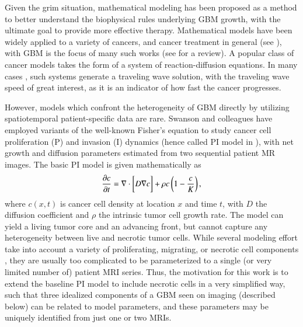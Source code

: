 \documentclass{aims}
\numberwithin{equation}{section}
\begin{document}
Given the grim situation, mathematical modeling has been proposed as a method to better understand the biophysical rules underlying GBM growth, with the ultimate goal to provide more effective therapy.  Mathematical models have been widely applied to a variety of cancers, and cancer treatment in general (see \cite{Kuang}), with GBM is the focus of many such works (see \cite{GBMreview} for a review).  A popular class of cancer models takes the form of a system of reaction-diffusion equations. In many cases \cite{Harley2014,Gerlee2016,Stepien2018}, such systems generate a traveling wave solution, with the traveling wave speed of great interest, as it is an indicator of how fast the cancer progresses.

However, models which confront the heterogeneity of GBM directly by utilizing spatiotemporal patient-specific data are rare. Swanson and colleagues \cite{Swanson2008,Neal2013,Jackson2015a} have employed variants of the well-known Fisher's equation to study cancer cell proliferation (P) and invasion (I) dynamics \cite{FISHER1937} (hence called PI model in \cite{Jackson2015a}), with net growth and diffusion parameters estimated from two sequential patient MR images.  The basic PI model is given mathematically as
\begin{equation}
\frac{\partial c}{\partial t} = \nabla\cdot\bigg[D \nabla{c}\bigg] + \rho c \left(1 - \frac{c}{K}\right),
\end{equation}
where $c(x,t)$ is cancer cell density at location $x$ and time $t$, with $D$ the diffusion coefficient and $\rho$ the intrinsic tumor cell growth rate.  The model can yield a living tumor core and an advancing front, but cannot capture any heterogeneity between live and necrotic tumor cells.  While several modeling effort take into account a variety of proliferating, migrating, or necrotic cell components \cite{Eikenberry2009,Swanson2011}, they are usually too complicated to be parameterized to a single (or very limited number of) patient MRI series.  Thus, the motivation for this work is to extend the baseline PI model to include necrotic cells in a very simplified way, such that three idealized components of a GBM seen on imaging (described below) can be related to model parameters, and these parameters may be uniquely identified from just one or two MRIs.
\end{document}
